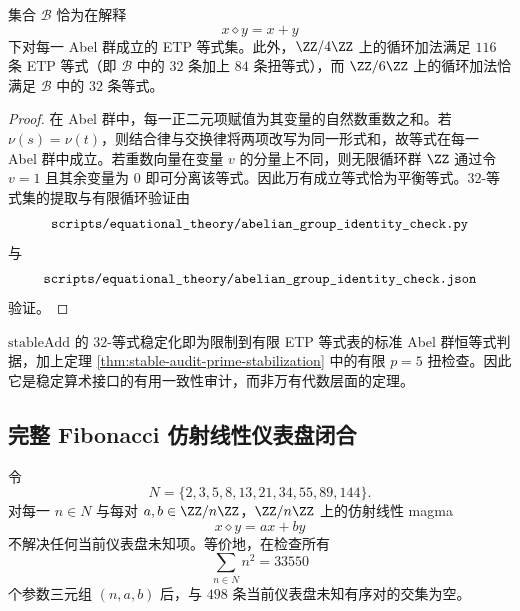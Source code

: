 \documentclass[../../main.tex]{subfiles}
\begin{document}
\begin{theorem}\label{thm:stable-audit-abelian-group-classification}
集合 \(\mathcal B\) 恰为在解释
\[
    x\diamond y=x+y
\]
下对每一 Abel 群成立的 ETP 等式集。此外，\(\ZZ/4\ZZ\) 上的循环加法满足 \(116\) 条 ETP 等式（即 \(\mathcal B\) 中的 \(32\) 条加上 \(84\) 条扭等式），而 \(\ZZ/6\ZZ\) 上的循环加法恰满足 \(\mathcal B\) 中的 \(32\) 条等式。
\end{theorem}

\begin{proof}
在 Abel 群中，每一正二元项赋值为其变量的自然数重数之和。若 \(\nu(s)=\nu(t)\)，则结合律与交换律将两项改写为同一形式和，故等式在每一 Abel 群中成立。若重数向量在变量 \(v\) 的分量上不同，则无限循环群 \(\ZZ\) 通过令 \(v=1\) 且其余变量为 \(0\) 即可分离该等式。因此万有成立等式恰为平衡等式。\(32\)-等式集的提取与有限循环验证由
\[
    \texttt{\detokenize{scripts/equational_theory/abelian_group_identity_check.py}}
\]
与
\[
    \texttt{\detokenize{scripts/equational_theory/abelian_group_identity_check.json}}
\]
验证。
\end{proof}

\begin{remark}[稳定加法稳定化的解读]\label{rem:stable-audit-abelian-shadow}
\(\mathrm{stableAdd}\) 的 \(32\)-等式稳定化即为限制到有限 ETP 等式表的标准 Abel 群恒等式判据，加上定理 \ref{thm:stable-audit-prime-stabilization} 中的有限 \(p=5\) 扭检查。因此它是稳定算术接口的有用一致性审计，而非万有代数层面的定理。
\end{remark}

\subsection{完整 Fibonacci 仿射线性仪表盘闭合}

\begin{theorem}\label{thm:stable-audit-affine-fibonacci-dashboard-closure}
令
\[
    N=\{2,3,5,8,13,21,34,55,89,144\}.
\]
对每一 \(n\in N\) 与每对 \(a,b\in\ZZ/n\ZZ\)，\(\ZZ/n\ZZ\) 上的仿射线性 magma
\[
    x\diamond y=ax+by
\]
不解决任何当前仪表盘未知项。等价地，在检查所有
\[
    \sum_{n\in N}n^2=33550
\]
个参数三元组 \((n,a,b)\) 后，与 \(498\) 条当前仪表盘未知有序对的交集为空。
\end{theorem}
\end{document}
